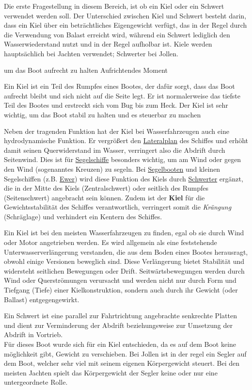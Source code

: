 Die erste Fragestellung in diesem Bereich, ist ob ein Kiel oder ein Schwert verwendet werden soll. Der Unterschied zwischen Kiel und Schwert besteht darin, dass ein Kiel über ein beträchtliches Eigengewicht verfügt, das in der Regel durch die Verwendung von Balast  erreicht wird, während  ein Schwert lediglich den Wasserwiederstand nutzt und in der Regel aufholbar ist. Kiele werden hauptsächlich bei Jachten verwendet; Schwerter bei Jollen. 

 um das Boot aufrecht zu halten
Aufrichtendes Moment


Ein Kiel ist ein Teil des Rumpfes eines Bootes, der dafür sorgt, dass das Boot aufrecht bleibt und sich nicht auf die Seite legt. Er ist normalerweise das tiefste Teil des Bootes und erstreckt sich vom Bug bis zum Heck. Der Kiel ist sehr wichtig, um das Boot stabil zu halten und es steuerbar zu machen 

Neben der tragenden Funktion hat der Kiel bei Wasserfahrzeugen auch eine hydrodynamische Funktion. Er vergrößert den \href{http://en.wikipedia.org/wiki/de:Lateralplan}{Lateralplan} des Schiffes und erhöht damit seinen Querwiderstand im Wasser, verringert also die Abdrift durch Seitenwind. Dies ist für \href{https://www.modellbau-wiki.de/wiki/Segel}{Segelschiffe} besonders wichtig, um am Wind oder gegen den Wind (sogenanntes Kreuzen) zu segeln. Bei \href{https://www.modellbau-wiki.de/wiki/Segel}{Segelbooten} und kleinen Segelschiffen (z.B. \href{http://en.wikipedia.org/wiki/de:Ewer}{Ewer}) wird diese Funktion des Kiels durch \href{https://www.modellbau-wiki.de/wiki/Schwert_(Schiffbau)}{Schwerter} ergänzt, die in der Mitte des Kiels (Zentralschwert) oder seitlich des Rumpfes (Seitenschwert) angebracht sein können. Zudem ist der \textbf{Kiel} für die Gewichtsstabilität des Schiffes verantwortlich, verringert somit die \textit{Krängung} (Schräglage) und verhindert ein Kentern des Schiffes.  

Ein Kiel ist bei den meisten Wasserfahrzeugen zu finden, egal ob sie durch Wind oder Motor angetrieben werden. Es wird allgemein als eine feststehende Unterwasserverlängerung verstanden, die aus dem Boden eines Bootes herausragt, obwohl einige Versionen beweglich sind. Diese Verlängerung bietet Stabilität und widersteht seitlichen Bewegungen oder Drift. Seitwärtsbewegungen werden durch Wind oder Querströmungen verursacht und werden nicht nur durch Form und Tiefgang (Tiefe) einer Kielkonstruktion, sondern auch durch ihr Gewicht (oder Ballast) entgegengewirkt. 

Ein Schwert ist eine parallel zur Fahrtrichtung angebrachte senkrechte Platten und dient zur Verminderung der Abdrift beziehungsweise zur Umsetzung der Abdrift in Vortrieb. 
\\
Für dieses Boot wurde sich für ein Kiel entschieden, da es auf dem Boot keine möglichkeit gibt, Gewicht zu verschieben. Bei Jollen ist in der regel ein Segler auf dem Boot, welcher sehr viel mit seinem eigenen Körpergewicht steuert. Bei den meisten Jachten spielt das Körpergewicht der Segler keine oder nur eine untergeordnete Rolle.






